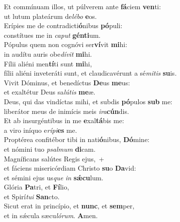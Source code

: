 \evenverse Et commínuam illos, ut púlverem ante \textbf{fá}ciem \textbf{ven}ti:~\*\\
\evenverse ut lutum plateárum de\textit{lé}\textit{bo} \textbf{e}os.\\
\oddverse Erípies me de contradicti\textbf{ó}nibus \textbf{pó}puli:~\*\\
\oddverse constítues me in \textit{ca}\textit{put} \textbf{gén}\textbf{ti}um.\\
\evenverse Pópulus quem non cognóvi ser\textbf{ví}vit \textbf{mi}hi:~\*\\
\evenverse in audítu auris obe\textit{dí}\textit{vit} \textbf{mi}hi.\\
\oddverse Fílii aliéni men\textbf{tí}ti sunt \textbf{mi}hi,~\*\\
\oddverse fílii aliéni inveteráti sunt, et claudicavérunt a sé\textit{mi}\textit{tis} \textbf{su}is.\\
\evenverse Vivit Dóminus, et benedíctus \textbf{De}us \textbf{me}us:~\*\\
\evenverse et exaltétur Deus sa\textit{lú}\textit{tis} \textbf{me}æ.\\
\oddverse Deus, qui das vindíctas mihi, et subdis \textbf{pó}pulos \textbf{sub} me:~\*\\
\oddverse liberátor meus de inimícis meis \textit{i}\textit{ra}\textbf{cún}dis.\\
\evenverse Et ab insurgéntibus in me \textbf{e}xal\textbf{tá}bis me:~\*\\
\evenverse a viro iníquo e\textit{rí}\textit{pi}\textbf{es} me.\\
\oddverse Proptérea confitébor tibi in nati\textbf{ó}nibus, \textbf{Dó}mine:~\*\\
\oddverse et nómini tuo \textit{psal}\textit{mum} \textbf{di}cam.\\
\evenverse Magníficans salútes Regis ejus,~+\\
\evenverse  et fáciens misericórdiam Christo \textbf{su}o \textbf{Da}vid:~\*\\
\evenverse et sémini ejus us\textit{que} \textit{in} \textbf{sǽ}\textbf{cu}lum.\\
\oddverse Glória \textbf{Pa}tri, et \textbf{Fí}lio,~\*\\
\oddverse et Spirí\textit{tu}\textit{i} \textbf{San}cto.\\
\evenverse Sicut erat in princípio, et \textbf{nunc}, et \textbf{sem}per,~\*\\
\evenverse et in sǽcula sæcu\textit{ló}\textit{rum}. \textbf{A}men.\\
